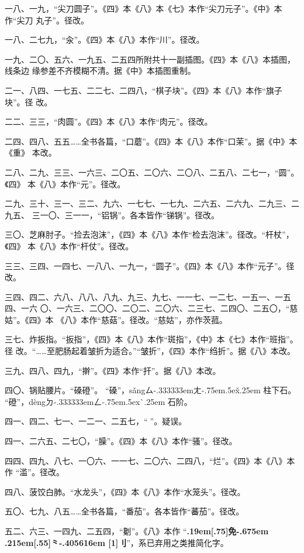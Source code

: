 \begin{list}{}
一八、一九，“尖刀圆子”。《四》本《八》本《七》本作“尖刀元子”。《中》本作“尖刀
丸子”。径改。

一八、二七九，“汆”。《四》本《八》本作“川”。径改。

一九、二〇、五六、一九五、二五四所附共十一副插图。《四》本《八》本插图，线条边
缘参差不齐模糊不清。据《中》本插图重制。

二一、八四、一七五、二二七、二四八，“棋子块”。《四》本《八》本作“旗子块”。径
改。

二二、三三，“肉圆”。《四》本《八》本作“肉元”。径改。

二四、四八、五五……全书各篇，“口蘑”。《四》本《八》本作“口茉”。据《中》本《重》
本改。

二八、二九、三三、一六三、二〇五、二〇六、二〇八、二五八、二七一，“圆”。《四》
本《八》本作“元”。径改。

二九、三十、三一、三二、九六、一七七、一七九、二六五、二六九、二九三、二九五、
三一〇、三一一，“铝锅”。各本皆作“锑锅”。径改。

三〇、芝麻肘子。“捡去泡沫”，《四》本《八》本作“检去泡沫”。径改。“杆杖”，《四》
本《八》本作“杆仗”。径改。

三三、三四、一四七、一八八、一九一，“圆子”。《四》本《八》本作“元子”。径改。

三四、四二、六八、八八、八九、九三、九七、一一七、一二七、一五一、一五四、一六
〇、一六三、二〇〇、二〇二、二〇六、二三七、二四〇、二五〇，“慈姑”。《四》本
《八》本作“慈菇”。径改。“慈姑”，亦作茨菰。

三七、炸扳指。“扳指”，《四》本《八》本作“斑指”，《中》本《七》本作“班指”。径
改。“……至肥肠起着皱折为适合。”“皱折”，《四》本作“绉折”。据《八》本改。

三九、四八、四九，“擀”。《四》本作“扞”。据《八》本改。

四〇、锅贴腰片。“磉磴”。
“磉”，{s\v{a}ng}{ㄙ\kern-.333333emㄤ\kern-.75em\raise.5ex\hbox{\v{}}\kern.25em}
柱下石。
“磴”，{d\`{e}ng}{ㄉ\kern-.333333emㄥ\kern-.75em\raise.5ex\hbox{\`{}}\kern.25em}
石阶。

四一、四二、七一、一二一、二五七，“𠟤”。疑误。

四一、二六五、二七〇，“臊”。《四》本《八》本作“骚”。径改。

四四、四九、八七、一〇六、一一七、二〇六、二四八，“烂”。《四》本《八》本作
“滥”。径改。

四八、菠饺白肺。“水龙头”，《四》本《八》本作“水笼头”。径改。

五〇、七九、八五……全书各篇，“番茄”。各本皆作“蕃茄”。径改。

五二、六三、一四九、二五四，“劖”。《八》本作
“{\bfseries\raise.19em\hbox{\scalebox{.675}[.75]{免}}\kern-.675em%
\lower.215em\hbox{\scalebox{.95}[.55]{⺀}}\kern-.405616em%
\scalebox{.65}[1]{刂}}”，系已弃用之类推简化字。


\end{list}
